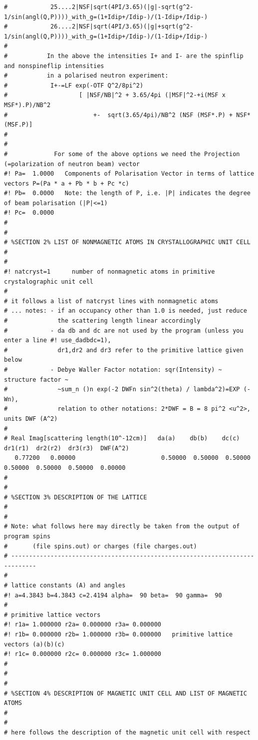 {\begin{verbatim}
#            25....2|NSF|sqrt(4PI/3.65)(|g|-sqrt(g^2-1/sin(angl(Q,P))))_with_g=(1+Idip+/Idip-)/(1-Idip+/Idip-)
#            26....2|NSF|sqrt(4PI/3.65)(|g|+sqrt(g^2-1/sin(angl(Q,P))))_with_g=(1+Idip+/Idip-)/(1-Idip+/Idip-)
#
#           In the above the intensities I+ and I- are the spinflip and nonspineflip intensities
#           in a polarised neutron experiment:
#            I+-=LF exp(-OTF Q^2/8pi^2) 
#                    [ |NSF/NB|^2 + 3.65/4pi (|MSF|^2-+i(MSF x MSF*).P)/NB^2
#                        +-  sqrt(3.65/4pi)/NB^2 (NSF (MSF*.P) + NSF* (MSF.P)]
#
#
#             For some of the above options we need the Projection (=polarization of neutron beam) vector
#! Pa=  1.0000   Components of Polarisation Vector in terms of lattice vectors P=(Pa * a + Pb * b + Pc *c)
#! Pb=  0.0000   Note: the length of P, i.e. |P| indicates the degree of beam polarisation (|P|<=1)
#! Pc=  0.0000
#
#
# %SECTION 2% LIST OF NONMAGNETIC ATOMS IN CRYSTALLOGRAPHIC UNIT CELL
#
#
#! natcryst=1      number of nonmagnetic atoms in primitive crystalographic unit cell
#
# it follows a list of natcryst lines with nonmagnetic atoms
# ... notes: - if an occupancy other than 1.0 is needed, just reduce 
#              the scattering length linear accordingly
#            - da db and dc are not used by the program (unless you enter a line #! use_dadbdc=1), 
#              dr1,dr2 and dr3 refer to the primitive lattice given below
#            - Debye Waller Factor notation: sqr(Intensity) ~ structure factor ~ 
#              ~sum_n ()n exp(-2 DWFn sin^2(theta) / lambda^2)=EXP (-Wn),  
#              relation to other notations: 2*DWF = B = 8 pi^2 <u^2>, units DWF (A^2)
#
# Real Imag[scattering length(10^-12cm)]   da(a)    db(b)    dc(c)    dr1(r1)  dr2(r2)  dr3(r3)  DWF(A^2)
   0.77200   0.00000                        0.50000  0.50000  0.50000  0.50000  0.50000  0.50000  0.00000
#
#
# %SECTION 3% DESCRIPTION OF THE LATTICE
#
#
# Note: what follows here may directly be taken from the output of program spins 
#       (file spins.out) or charges (file charges.out)
# -----------------------------------------------------------------------------
#
# lattice constants (A) and angles 
#! a=4.3843 b=4.3843 c=2.4194 alpha=  90 beta=  90 gamma=  90
#
# primitive lattice vectors 
#! r1a= 1.000000 r2a= 0.000000 r3a= 0.000000
#! r1b= 0.000000 r2b= 1.000000 r3b= 0.000000   primitive lattice vectors (a)(b)(c)
#! r1c= 0.000000 r2c= 0.000000 r3c= 1.000000
#
#
#
# %SECTION 4% DESCRIPTION OF MAGNETIC UNIT CELL AND LIST OF MAGNETIC ATOMS
#
#
# here follows the description of the magnetic unit cell with respect

\end{verbatim}}
